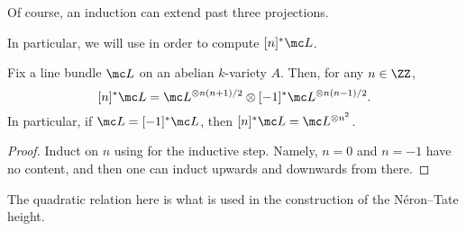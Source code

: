 \documentclass[../notes.tex]{subfiles}
\begin{document}
\begin{remark}
	Of course, an induction can extend past three projections.
\end{remark}
In particular, we will use  in order to compute $[n]^*\mc L$.
\begin{corollary}
	Fix a line bundle $\mc L$ on an abelian $k$-variety $A$. Then, for any $n\in\ZZ$,
	\[[n]^*\mc L=\mc L^{\otimes n(n+1)/2}\otimes[-1]^*\mc L^{\otimes n(n-1)/2}.\]
	In particular, if $\mc L=[-1]^*\mc L$, then $[n]^*\mc L=\mc L^{\otimes n^2}$.
\end{corollary}
\begin{proof}
	Induct on $n$ using  for the inductive step. Namely, $n=0$ and $n=-1$ have no content, and then one can induct upwards and downwards from there.
\end{proof}
\begin{remark}
	The quadratic relation here is what is used in the construction of the N\'eron--Tate height.
\end{remark}
\end{document}
